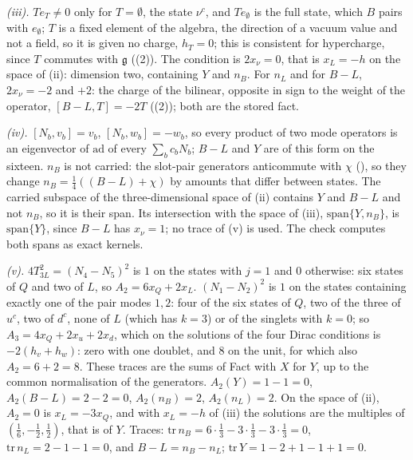 \emph{(iii).} $T e_{T} \neq 0$ only for $T = \emptyset$, the state $\nu^{c}$, and $T e_{\emptyset}$ is the full state, which $B$ pairs with $e_{\emptyset}$; $T$ is a fixed element of the algebra, the direction of a vacuum value and not a field, so it is given no charge, $h_{T} = 0$; this is consistent for hypercharge, since $T$ commutes with $\mathfrak{g}$ ((2)). The condition is $2x_{\nu} = 0$, that is $x_{L} = -h$ on the space of (ii): dimension two, containing $Y$ and $n_{B}$. For $n_{L}$ and for $B - L$, $2x_{\nu} = -2$ and $+2$: the charge of the bilinear, opposite in sign to the weight of the operator, $[B - L, T] = -2T$ ((2)); both are the stored fact.

\emph{(iv).} $[N_{b}, v_{b}] = v_{b}$, $[N_{b}, w_{b}] = -w_{b}$, so every product of two mode operators is an eigenvector of $\mathrm{ad}$ of every $\sum_{b} c_{b}N_{b}$; $B - L$ and $Y$ are of this form on the sixteen. $n_{B}$ is not carried: the slot-pair generators anticommute with $\chi$ (), so they change $n_{B} = \tfrac14((B - L) + \chi)$ by amounts that differ between states. The carried subspace of the three-dimensional space of (ii) contains $Y$ and $B - L$ and not $n_{B}$, so it is their span. Its intersection with the space of (iii), $\mathrm{span}\{Y, n_{B}\}$, is $\mathrm{span}\{Y\}$, since $B - L$ has $x_{\nu} = 1$; no trace of (v) is used. The check computes both spans as exact kernels.

\emph{(v).} $4T_{3L}^{2} = (N_{4} - N_{5})^{2}$ is $1$ on the states with $j = 1$ and $0$ otherwise: six states of $Q$ and two of $L$, so $A_{2} = 6x_{Q} + 2x_{L}$. $(N_{1} - N_{2})^{2}$ is $1$ on the states containing exactly one of the pair modes $1, 2$: four of the six states of $Q$, two of the three of $u^{c}$, two of $d^{c}$, none of $L$ (which has $k = 3$) or of the singlets with $k = 0$; so $A_{3} = 4x_{Q} + 2x_{u} + 2x_{d}$, which on the solutions of the four Dirac conditions is $-2(h_{v} + h_{w})$: zero with one doublet, and $8$ on the unit, for which also $A_{2} = 6 + 2 = 8$. These traces are the sums of Fact  with $X$ for $Y$, up to the common normalisation of the generators. $A_{2}(Y) = 1 - 1 = 0$, $A_{2}(B - L) = 2 - 2 = 0$, $A_{2}(n_{B}) = 2$, $A_{2}(n_{L}) = 2$. On the space of (ii), $A_{2} = 0$ is $x_{L} = -3x_{Q}$, and with $x_{L} = -h$ of (iii) the solutions are the multiples of $(\tfrac16, -\tfrac12, \tfrac12)$, that is of $Y$. Traces: $\mathrm{tr}\,n_{B} = 6\cdot\tfrac13 - 3\cdot\tfrac13 - 3\cdot\tfrac13 = 0$, $\mathrm{tr}\,n_{L} = 2 - 1 - 1 = 0$, and $B - L = n_{B} - n_{L}$; $\mathrm{tr}\,Y = 1 - 2 + 1 - 1 + 1 = 0$.

